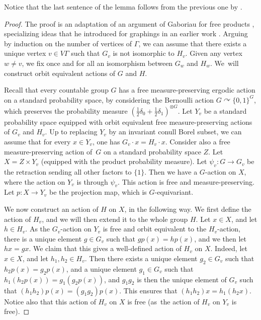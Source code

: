 \documentclass[11pt]{article}
\numberwithin{equation}{section}
\theoremstyle{plain}
\theoremstyle{definition}
\begin{document}
Notice that the last sentence of the lemma follows from the previous one by \cite[Th.\,2.3]{Gab2}.

\begin{proof}
The proof is an adaptation of an argument of Gaboriau for free products \cite[$\mathbf{P}_{\mathrm{ME}}\mathbf{6}$]{Gab}, specializing ideas that he introduced for graphings in an earlier work \cite[Part\,IV]{Gab-cost}. Arguing by induction on the number of vertices of $\Gamma$, we can assume that there exists a unique vertex $v\in V\Gamma$ such that $G_v$ is not isomorphic to $H_v$. Given any vertex $w\neq v$, we fix once and for all an isomorphism between $G_w$ and $H_w$. We~will construct orbit equivalent actions of $G$ and $H$.

Recall that every countable group $G$ has a free measure-preserving ergodic action on a standard probability space, by considering the Bernoulli action $G\curvearrowright\{0,1\}^G$, which preserves the probability measure $\left(\frac{1}{2}\delta_0+\frac{1}{2}\delta_1\right)^{\otimes G}$. Let $Y_v$ be a standard probability space equipped with orbit equivalent free measure-preserving actions of $G_v$ and $H_v$. Up to replacing $Y_v$ by an invariant conull Borel subset, we can assume that for every $x\in Y_v$, one has $G_v\cdot x=H_v\cdot x$. Consider also a free measure-preserving action of~$G$ on a standard probability space $Z$. Let $X=Z\times Y_v$ (equipped with the product probability measure). Let $\psi_v:G\to G_v$ be the retraction sending all other factors to $\{1\}$. Then we have a $G$-action on $X$, where the action on $Y_v$ is through $\psi_v$. This action is free and measure-preserving. Let $p:X\to Y_v$ be the projection map, which is $G$-equivariant.

We now construct an action of $H$ on $X$, in the following way. We first define the action of $H_v$, and we will then extend it to the whole group $H$. Let $x\in X$, and let $h\in H_v$. As the $G_v$-action on $Y_v$ is free and orbit equivalent to the $H_v$-action, there is a unique element $g\in G_v$ such that $gp(x)=hp(x)$, and we then let $hx=gx$. We claim that this gives a well-defined action of $H_v$ on $X$. Indeed, let $x\in X$, and let $h_1,h_2\in H_v$. Then there exists a unique element $g_2\in G_v$ such that $h_2p(x)=g_2p(x)$, and a unique element $g_1\in G_v$ such that $h_1(h_2p(x))=g_1(g_2p(x))$, and $g_1g_2$ is then the unique element of $G_v$ such that $(h_1h_2)p(x)=(g_1g_2)p(x)$. This ensures that $(h_1h_2)x=h_1(h_2x)$. Notice also that this action of $H_v$ on $X$ is free (as~the action of $H_v$ on $Y_v$ is free).


\end{proof}
\end{document}
